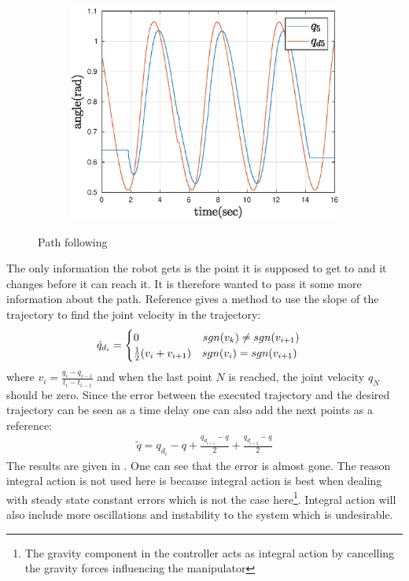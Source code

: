 \begin{figure}[htbp]
\begin{subfigure}[htbp]{0.45\textwidth}
        \includegraphics[width = \picsSiz\linewidth]{img/pathF5.eps}
        \caption{}
    \end{subfigure}
    \caption{Path following}
    \label{fig:pathTS}
\end{figure}
The only information the robot gets is the point it is supposed to get to and it changes before it can reach it. It is therefore wanted to pass it some more information about the path. Reference \cite{Siciliano} gives a method to use the slope of the trajectory to find the joint velocity in the trajectory:
\begin{align*}
    \dot{q}_{d_i} = 
    \begin{cases}
    0\hphantom{ \frac{1}{2}(v_i+v_{i+1})}\;\;sgn(v_k)\ne sgn(v_{i+1})\\
    \frac{1}{2}(v_i+v_{i+1}) \quad  sgn(v_i)= sgn(v_{i+1})
    \end{cases}
\end{align*}
where $v_i = \frac{q_i-q_{i-1}}{t_i-t_{i-1}}$ and when the last point $N$ is reached, the joint velocity $q_N$ should be zero. Since the error between the executed trajectory and the desired trajectory can be seen as a time delay one can also add the next points as a reference:
\begin{align*}
    \tilde{q} = q_{d_i}-q + \frac{q_{d_{i+1}}-q }{2}+\frac{q_{d_{i+2}}-q }{2}
\end{align*}
The results are given in . One can see that the error is almost gone. The reason integral action is not used here is because integral action is best when dealing with steady state constant errors which is not the case here\footnote{The gravity component in the controller acts as integral action by cancelling the gravity forces influencing the manipulator}. Integral action will also include more oscillations and instability to the system which is undesirable.



